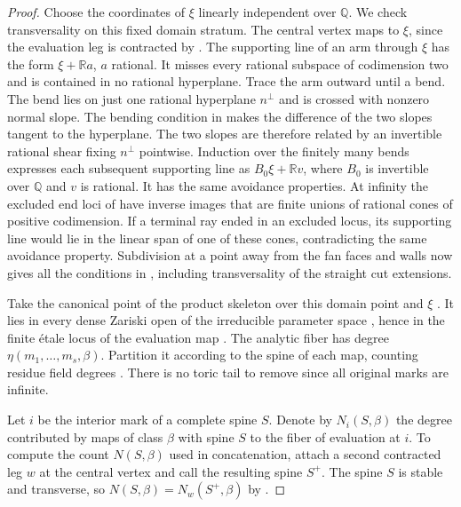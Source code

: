 \documentclass[11pt,reqno]{amsart}
\numberwithin{equation}{section}
\theoremstyle{definition}
\theoremstyle{remark}
\begin{document}
\begin{proof}
Choose the coordinates of \(\xi\) linearly independent over \(\mathbb Q\).
We check transversality on this fixed domain stratum.
The central vertex maps to \(\xi\), since the evaluation leg is contracted
by \cite[Lemma~8.22]{KY}. The supporting line of an arm through \(\xi\)
has the form \(\xi+\mathbb R a\), \(a\) rational. It misses every rational
subspace of codimension two and is contained in no rational hyperplane.
Trace the arm outward until a bend. The bend lies on just one rational
hyperplane \(n^\perp\) and is crossed with nonzero normal slope. The
bending condition in \cite[Definition~4.17]{KY} makes the difference of
the two slopes tangent to the hyperplane. The two slopes are therefore
related by an invertible rational shear fixing \(n^\perp\) pointwise.
Induction over the finitely many bends expresses each subsequent supporting
line as \(B_0\xi+\mathbb R v\), where \(B_0\) is invertible over
\(\mathbb Q\) and \(v\) is rational. It has the same avoidance properties.
At infinity the excluded end loci of
\cite[Construction~4.15]{KY} have inverse images that are finite unions
of rational cones of positive codimension. If a terminal ray ended
in an excluded locus, its supporting line would lie in the linear
span of one of these cones, contradicting the same avoidance property.
Subdivision at a point away from the fan faces
and walls now gives all the conditions in \cite[Definition~4.20]{KY},
including transversality of the straight cut extensions.

Take the canonical point of the product skeleton over this domain
point and \(\xi\) \cite[Proposition~8.8 and \S14.1]{KY}. It lies in
every dense Zariski open of the irreducible parameter space
\cite[Lemma~8.2]{KY}, hence in the finite \'etale locus of the
evaluation map \cite[Definition~1.1 and Proposition~3.13]{KY}.
The analytic fiber has degree \(\eta(m_1,\ldots,m_s,\beta)\).
Partition it according to the spine of each map, counting residue
field degrees \cite[Construction~9.2 and Lemmas~8.20--8.21]{KY}.
There is no toric tail to remove since all original marks are infinite.

Let \(i\) be the interior mark of a complete spine \(S\). Denote by
\(N_i(S,\beta)\) the degree contributed by maps of class \(\beta\)
with spine \(S\) to the fiber of evaluation at \(i\).
To compute the count \(N(S,\beta)\) used in concatenation, attach
a second contracted leg \(w\) at the central vertex and call the
resulting spine \(S^+\). The spine \(S\) is stable and transverse, so
\(N(S,\beta)=N_w(S^+,\beta)\) by
\cite[Proposition~9.5 and Definition~9.6]{KY}.


\end{proof}
\end{document}
